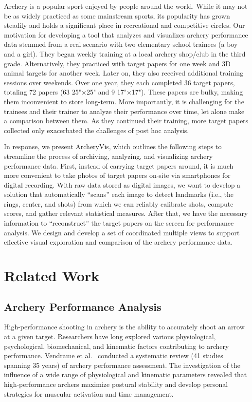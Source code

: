 \documentclass[runningheads]{llncs}
\begin{document}
Archery is a popular sport enjoyed by people around the world. 
While it may not be as widely practiced as some mainstream sports, its popularity has grown steadily and holds a significant place in recreational and competitive circles. 
Our motivation for developing a tool that analyzes and visualizes archery performance data stemmed from a real scenario with two elementary school trainees (a boy and a girl). 
They began weekly training at a local archery shop/club in the third grade. 
Alternatively, they practiced with target papers for one week and 3D animal targets for another week. 
Later on, they also received additional training sessions over weekends. 
Over one year, they each completed 36 target papers, totaling 72 papers (63 25"$\times$25" and 9 17"$\times$17"). 
These papers are bulky, making them inconvenient to store long-term. 
More importantly, it is challenging for the trainees and their trainer to analyze their performance over time, let alone make a comparison between them. 
As they continued their training, more target papers collected only exacerbated the challenges of post hoc analysis. 

In response, we present ArcheryVis, which outlines the following steps to streamline the process of archiving, analyzing, and visualizing archery performance data. 
First, instead of carrying target papers around, it is much more convenient to take photos of target papers on-site via smartphones for digital recording. 
With raw data stored as digital images, we want to develop a solution that automatically ``scans'' each image to detect landmarks (i.e., the rings, center, and shots) from which we can reliably calibrate shots, compute scores, and gather relevant statistical measures. 
After that, we have the necessary information to ``reconstruct'' the target papers on the screen for performance analysis. 
We design and develop a set of coordinated multiple views to support effective visual exploration and comparison of the archery performance data. 

\section{Related Work}
\label{sec:rw}

\subsection{Archery Performance Analysis}
 
High-performance shooting in archery is the ability to accurately shoot an arrow at a given target. 
% 
Researchers have long explored various physiological, psychological, biomechanical, and kinematic factors contributing to archery performance. 
%
Vendrame et al.\ \cite{Vendrame-SB22} conducted a systematic review (41 studies spanning 35 years) of archery performance assessment. The investigation of the influence of a wide range of physiological and kinematic parameters revealed that high-performance archers maximize postural stability and develop personal strategies for muscular activation and time management.
\end{document}
